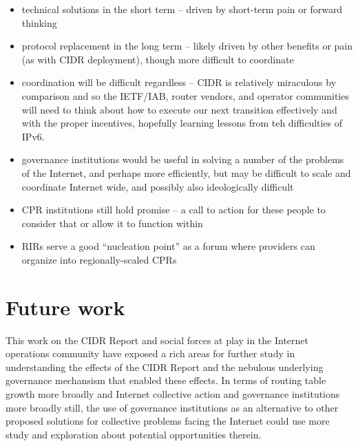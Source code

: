\begin{itemize}

\item{technical solutions in the short term -- driven by short-term pain or
forward thinking}

\item{protocol replacement in the long term -- likely driven by other benefits
or pain (as with CIDR deployment), though more difficult to coordinate}

\item{coordination will be difficult regardless -- CIDR is relatively
miraculous by comparison and so the IETF/IAB, router vendors, and operator
communities will need to think about how to execute our next transition
effectively and with the proper incentives, hopefully learning lessons from teh
difficulties of IPv6.}

\item{governance institutions would be useful in solving a number of the
problems of the Internet, and perhaps more efficiently, but may be difficult to
scale and coordinate Internet wide, and possibly also ideologically difficult}

\item{CPR institutions still hold promise -- a call to action for these people
to consider that or allow it to function within}

\item{RIRs serve a good ``nucleation point'' as a forum where providers can
organize into regionally-scaled CPRs}

\end{itemize}

\section{Future work}
This work on the CIDR Report and social forces at play in the Internet
operations community have exposed a rich areas for further study in
understanding the effects of the CIDR Report and the nebulous underlying
governance mechansism that enabled these effects. In terms of routing table
growth more broadly and Internet collective action and governance institutions
more broadly still, the use of governance institutions as an alternative to
other proposed solutions for collective problems facing the Internet could use
more study and exploration about potential opportunities therein.

